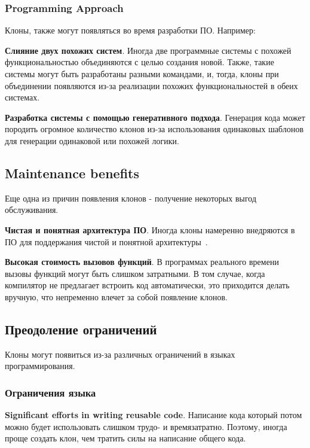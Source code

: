 \subsubsection{Programming Approach}

Клоны, также могут появляться во время разработки ПО. Например:

\textbf{Слияние двух похожих систем}. Иногда две программные системы с похожей функциональностью объединяются с целью создания новой. Также, такие системы могут быть разработаны разными командами, и, тогда, клоны при объединении появляются из-за реализации похожих функциональностей в обеих системах.

\textbf{Разработка системы с помощью генеративного подхода}. Генерация кода может породить огромное количество клонов из-за использования одинаковых шаблонов для генерации одинаковой или похожей логики.

\subsection{Maintenance benefits}

Еще одна из причин появления клонов - получение некоторых выгод обслуживания.

\textbf{Чистая и понятная архитектура ПО}. Иногда клоны намеренно внедряются в ПО для поддержания чистой и понятной архитектуры~\cite{forking}.

\textbf{Высокая стоимость вызовов функций}. В программах реального времени вызовы функций могут быть слишком затратными. В том случае, когда компилятор не предлагает встроить код автоматически, это приходится делать вручную, что непременно влечет за собой появление клонов.

\subsection{Преодоление ограничений}

Клоны могут появиться из-за различных ограничений в языках программирования.

\subsubsection{Ограничения языка}

\textbf{Significant efforts in writing reusable code}. Написание кода который потом можно будет использовать слишком трудо- и времязатратно. Поэтому, иногда проще создать клон, чем тратить силы на написание общего кода.

